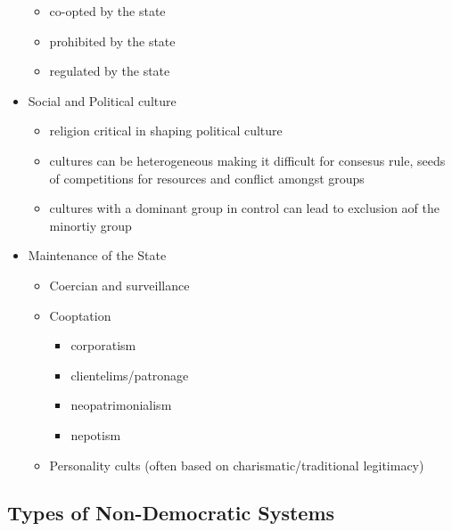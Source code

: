 \documentclass[11pt]{article}
\begin{document}
\begin{itemize}
\begin{itemize}
\item co-opted by the state
\item prohibited by the state
\item regulated by the state
\end{itemize}
\item Social and Political culture
\begin{itemize}
\item religion critical in shaping political culture
\item cultures can be heterogeneous making it difficult for consesus rule, seeds of competitions for resources and conflict amongst groups
\item cultures with a dominant group in control can lead to exclusion aof the minortiy group
\end{itemize}
\item Maintenance of the State
\begin{itemize}
\item Coercian and surveillance
\item Cooptation
\begin{itemize}
\item corporatism
\item clientelims/patronage
\item neopatrimonialism
\item nepotism
\end{itemize}
\item Personality cults (often based on charismatic/traditional legitimacy)
\end{itemize}
\end{itemize}
\subsection{Types of Non-Democratic Systems}
\label{sec:org4f4f4ad}
\end{document}

